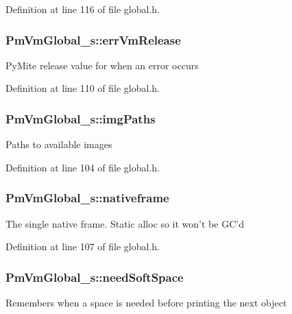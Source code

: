 Definition at line 116 of file global.\-h.

\hypertarget{struct_pm_vm_global__s_a7ac32c5d000dcefeca9787082cb18759}{
\subsubsection[{err\-Vm\-Release}]{ Pm\-Vm\-Global\-\_\-s\-::err\-Vm\-Release}}\label{struct_pm_vm_global__s_a7ac32c5d000dcefeca9787082cb18759}
Py\-Mite release value for when an error occurs 

Definition at line 110 of file global.\-h.

\hypertarget{struct_pm_vm_global__s_af56e5a34119a2803b3f1a865bae755bb}{
\subsubsection[{img\-Paths}]{ Pm\-Vm\-Global\-\_\-s\-::img\-Paths}}\label{struct_pm_vm_global__s_af56e5a34119a2803b3f1a865bae755bb}
Paths to available images 

Definition at line 104 of file global.\-h.

\hypertarget{struct_pm_vm_global__s_a950d59b1e8c7c2c4e2421bb2e935f2b1}{
\subsubsection[{nativeframe}]{ Pm\-Vm\-Global\-\_\-s\-::nativeframe}}\label{struct_pm_vm_global__s_a950d59b1e8c7c2c4e2421bb2e935f2b1}
The single native frame. Static alloc so it won't be G\-C'd 

Definition at line 107 of file global.\-h.

\hypertarget{struct_pm_vm_global__s_a41bd828fa0f0794c6543633f9ac52f22}{
\subsubsection[{need\-Soft\-Space}]{ Pm\-Vm\-Global\-\_\-s\-::need\-Soft\-Space}}\label{struct_pm_vm_global__s_a41bd828fa0f0794c6543633f9ac52f22}
Remembers when a space is needed before printing the next object 


